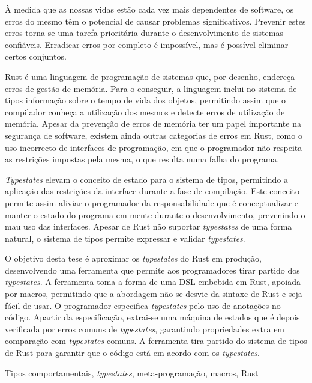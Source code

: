 

À medida que as nossas vidas estão cada vez mais dependentes de software,
os erros do mesmo têm o potencial de causar problemas significativos.
Prevenir estes erros torna-se uma tarefa prioritária durante o desenvolvimento de sistemas confiáveis.
Erradicar erros por completo é impossível, mas é possível eliminar certos conjuntos.

Rust é uma linguagem de programação de sistemas que, por desenho, endereça erros de gestão de memória.
Para o conseguir, a linguagem inclui no sistema de tipos informação sobre o tempo de vida dos objetos,
permitindo assim que o compilador conheça a utilização dos mesmos e detecte erros de utilização de memória.
Apesar da prevenção de erros de memória ter um papel importante na segurança de software,
existem ainda outras categorias de erros em Rust,
como o uso incorrecto de interfaces de programação, em que o programador não respeita as restrições impostas pela mesma, o que resulta numa falha do programa.

\emph{Typestates} elevam o conceito de estado para o sistema de tipos,
permitindo a aplicação das restrições da interface durante a fase de compilação.
Este conceito permite assim aliviar o programador da responsabilidade que é conceptualizar e manter o estado do programa em mente durante o desenvolvimento, prevenindo o mau uso das interfaces.
Apesar de Rust não suportar \emph{typestates} de uma forma natural,
o sistema de tipos permite expressar e validar \emph{typestates}.

O objetivo desta tese é aproximar os \emph{typestates} do Rust em produção,
desenvolvendo uma ferramenta que permite aos programadores tirar partido dos \emph{typestates}.
A ferramenta toma a forma de uma DSL embebida em Rust, apoiada por macros,
permitindo que a abordagem não se desvie da sintaxe de Rust e seja fácil de usar.
O programador especifica \emph{typestates} pelo uso de anotações no código.
Apartir da especificação, extrai-se uma máquina de estados que é depois verificada por erros comuns de \emph{typestates},
garantindo propriedades extra em comparação com \emph{typestates} comuns.
A ferramenta tira partido do sistema de tipos de Rust para garantir que o código está em acordo com os \emph{typestates}.

\begin{keywords}
Tipos comportamentais, \emph{typestates}, meta-programação, macros, Rust
\end{keywords}
